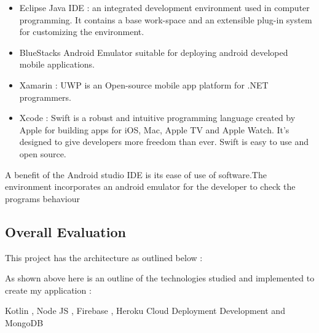 \begin{itemize}
  \item Eclipse Java  IDE :  an integrated development environment used in computer programming. It contains a base work-space and an extensible plug-in system for customizing the environment.
  \item BlueStacks Android Emulator suitable for deploying android developed mobile applications.
  \item Xamarin : UWP  is an Open-source mobile app platform for .NET programmers.
  
  \item Xcode : Swift is a robust and intuitive programming language created by Apple for building apps for iOS, Mac, Apple TV and Apple Watch. It's designed to give developers more freedom than ever. Swift is easy to use and open source. 
\end{itemize}

A  benefit of the  Android studio IDE is its ease of use of software.The environment incorporates an android emulator for the developer to check the  programs behaviour 

\subsection{Overall  Evaluation}

This project has the  architecture as outlined  below  :

As shown above here is an outline of the technologies studied and implemented to create my application :

Kotlin , Node JS , Firebase , Heroku Cloud Deployment Development and  MongoDB

